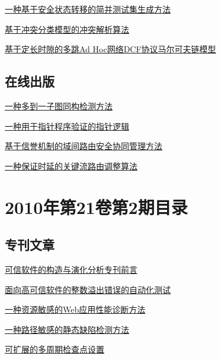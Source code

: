 \documentclass[a4paper]{article}
\begin{document}
\href{http://www.jos.org.cn/ch/reader/download_pdf.aspx?file_no=3429&year_id=2010&quarter_id=3&falg=1}{一种基于安全状态转移的简并测试集生成方法}

\href{http://www.jos.org.cn/ch/reader/download_pdf.aspx?file_no=3452&year_id=2010&quarter_id=3&falg=1}{基于冲突分类模型的冲突解析算法}

\href{http://www.jos.org.cn/ch/reader/download_pdf.aspx?file_no=3550&year_id=2010&quarter_id=3&falg=1}{基于定长时隙的多跳Ad Hoc网络DCF协议马尔可夫链模型}

\subsection{在线出版}
\href{http://www.jos.org.cn/ch/reader/download_pdf.aspx?file_no=3478&year_id=2010&quarter_id=3&falg=1}{一种多到一子图同构检测方法}

\href{http://www.jos.org.cn/ch/reader/download_pdf.aspx?file_no=3620&year_id=2010&quarter_id=3&falg=1}{一种用于指针程序验证的指针逻辑}

\href{http://www.jos.org.cn/ch/reader/download_pdf.aspx?file_no=3479&year_id=2010&quarter_id=3&falg=1}{基于信誉机制的域间路由安全协同管理方法}

\href{http://www.jos.org.cn/ch/reader/download_pdf.aspx?file_no=3489&year_id=2010&quarter_id=3&falg=1}{一种保证时延的关键流路由调整算法}


\section{\textbf{2010年第21卷第2期目录}}
\subsection{专刊文章}
\href{http://www.jos.org.cn/ch/reader/download_pdf.aspx?file_no=3815&year_id=2010&quarter_id=2&falg=1}{可信软件的构造与演化分析专刊前言}

\href{http://www.jos.org.cn/ch/reader/download_pdf.aspx?file_no=3785&year_id=2010&quarter_id=2&falg=1}{面向高可信软件的整数溢出错误的自动化测试}

\href{http://www.jos.org.cn/ch/reader/download_pdf.aspx?file_no=3781&year_id=2010&quarter_id=2&falg=1}{一种资源敏感的Web应用性能诊断方法}

\href{http://www.jos.org.cn/ch/reader/download_pdf.aspx?file_no=3782&year_id=2010&quarter_id=2&falg=1}{一种路径敏感的静态缺陷检测方法}

\href{http://www.jos.org.cn/ch/reader/download_pdf.aspx?file_no=3787&year_id=2010&quarter_id=2&falg=1}{可扩展的多周期检查点设置}
\end{document}
